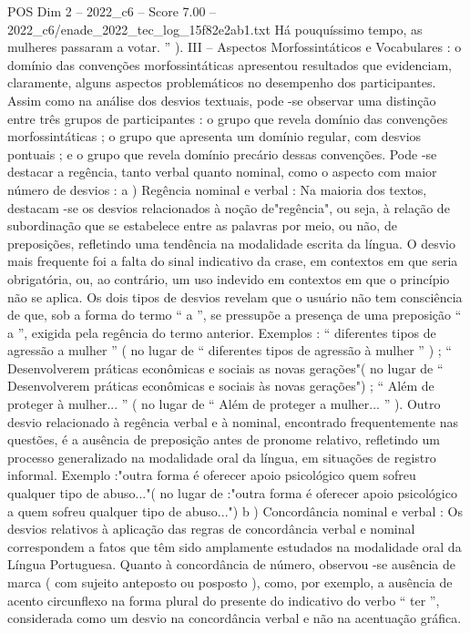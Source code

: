 \begin{textsample}{POS Dim 2 – 2022\_c6 – Score 7.00 – 2022\_c6/enade\_2022\_tec\_log\_15f82e2ab1.txt}
Há pouquíssimo tempo, as mulheres passaram a votar. ” ).
III – Aspectos Morfossintáticos e Vocabulares : o domínio das convenções morfossintáticas apresentou resultados que evidenciam, claramente, alguns aspectos problemáticos no desempenho dos participantes.
Assim como na análise dos desvios textuais, pode -se observar uma distinção entre três grupos de participantes : o grupo que revela domínio das convenções morfossintáticas ; o grupo que apresenta um domínio regular, com desvios pontuais ; e o grupo que revela domínio precário dessas convenções.
Pode -se destacar a regência, tanto verbal quanto nominal, como o aspecto com maior número de desvios : a ) Regência nominal e verbal : Na maioria dos textos, destacam -se os desvios relacionados à noção de"regência", ou seja, à relação de subordinação que se estabelece entre as palavras por meio, ou não, de preposições, refletindo uma tendência na modalidade escrita da língua.
O desvio mais frequente foi a falta do sinal indicativo da crase, em contextos em que seria obrigatória, ou, ao contrário, um uso indevido em contextos em que o princípio não se aplica.
Os dois tipos de desvios revelam que o usuário não tem consciência de que, sob a forma do termo “ a ”, se pressupõe a presença de uma preposição “ a ”, exigida pela regência do termo anterior.
Exemplos : “ diferentes tipos de agressão a mulher ” ( no lugar de “ diferentes tipos de agressão à mulher ” ) ; “ Desenvolverem práticas econômicas e sociais as novas gerações"( no lugar de “ Desenvolverem práticas econômicas e sociais às novas gerações") ; “ Além de proteger à mulher... ” ( no lugar de “ Além de proteger a mulher... ” ).
Outro desvio relacionado à regência verbal e à nominal, encontrado frequentemente nas questões, é a ausência de preposição antes de pronome relativo, refletindo um processo generalizado na modalidade oral da língua, em situações de registro informal.
Exemplo :"outra forma é oferecer apoio psicológico quem sofreu qualquer tipo de abuso..."( no lugar de :"outra forma é oferecer apoio psicológico a quem sofreu qualquer tipo de abuso...") b ) Concordância nominal e verbal : Os desvios relativos à aplicação das regras de concordância verbal e nominal correspondem a fatos que têm sido amplamente estudados na modalidade oral da Língua Portuguesa.
Quanto à concordância de número, observou -se ausência de marca ( com sujeito anteposto ou posposto ), como, por exemplo, a ausência de acento circunflexo na forma plural do presente do indicativo do verbo “ ter ”, considerada como um desvio na concordância verbal e não na acentuação gráfica.

\end{textsample}
